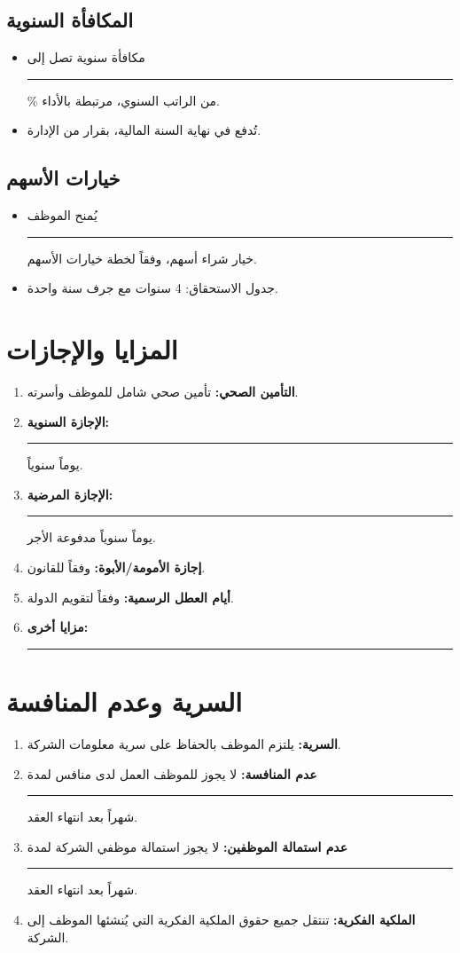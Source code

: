 \documentclass[12pt,a4paper]{article}
\begin{document}
\subsection{المكافأة السنوية}
\begin{itemize}
    \item مكافأة سنوية تصل إلى \rule{2cm}{0.4pt}\% من الراتب السنوي، مرتبطة بالأداء.
    \item تُدفع في نهاية السنة المالية، بقرار من الإدارة.
\end{itemize}

\subsection{خيارات الأسهم}
\begin{itemize}
    \item يُمنح الموظف \rule{3cm}{0.4pt} خيار شراء أسهم، وفقاً لخطة خيارات الأسهم.
    \item جدول الاستحقاق: 4 سنوات مع جرف سنة واحدة.
\end{itemize}

\section{المزايا والإجازات}
\label{sec:benefits}
\begin{enumerate}
    \item \textbf{التأمين الصحي:} تأمين صحي شامل للموظف وأسرته.
    \item \textbf{الإجازة السنوية:} \rule{2cm}{0.4pt} يوماً سنوياً.
    \item \textbf{الإجازة المرضية:} \rule{2cm}{0.4pt} يوماً سنوياً مدفوعة الأجر.
    \item \textbf{إجازة الأمومة/الأبوة:} وفقاً للقانون.
    \item \textbf{أيام العطل الرسمية:} وفقاً لتقويم الدولة.
    \item \textbf{مزايا أخرى:} \rule{8cm}{0.4pt}
\end{enumerate}

\section{السرية وعدم المنافسة}
\label{sec:confidentiality}
\begin{enumerate}
    \item \textbf{السرية:} يلتزم الموظف بالحفاظ على سرية معلومات الشركة.
    \item \textbf{عدم المنافسة:} لا يجوز للموظف العمل لدى منافس لمدة \rule{2cm}{0.4pt} شهراً بعد انتهاء العقد.
    \item \textbf{عدم استمالة الموظفين:} لا يجوز استمالة موظفي الشركة لمدة \rule{2cm}{0.4pt} شهراً بعد انتهاء العقد.
    \item \textbf{الملكية الفكرية:} تنتقل جميع حقوق الملكية الفكرية التي يُنشئها الموظف إلى الشركة.
\end{enumerate}
\end{document}
